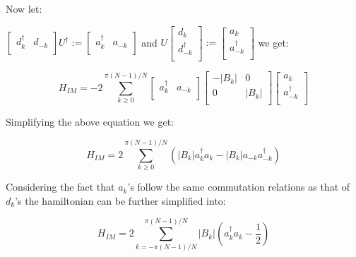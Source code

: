 \documentclass[11pt,a4paper]{article}
\begin{document}
	  Now let:
	    
	  
	    
	    	    
	     $ \begin{bmatrix}
	    d_{k}^{\dagger} & d_{-k}\\
	    \end{bmatrix} U^{\dagger} := \begin{bmatrix}
	    a_{k}^{\dagger} & a_{-k}\\
	    \end{bmatrix} $ and $ U\begin{bmatrix}
	    d_{k}\\d_{-k}^{\dagger}\\
	    \end{bmatrix}  := \begin{bmatrix}
	    a_{k}\\a_{-k}^{\dagger}\\
	    \end{bmatrix}$ we get:
	    
	    
		    \begin{equation}
		    H_{IM} = -2\sum_{k\geq 0}^{ \pi (N-1)/N}\begin{bmatrix}
		    a_{k}^{\dagger} & a_{-k}\\
		    \end{bmatrix}  \begin{bmatrix}
		   -|B_{k}| & 0\\
		    0 & |B_{k}| \\
		    \end{bmatrix}\begin{bmatrix}
		    a_{k}\\a_{-k}^{\dagger}\\
		    \end{bmatrix}
		    \end{equation}
		    
		    Simplifying the above equation we get:
		    
		    \begin{equation}
		     H_{IM} = 2\sum_{k\geq 0}^{ \pi (N-1)/N} (|B_{k}|a_{k}^{\dagger}a_{k}-|B_{k}|a_{-k}a_{-k}^{\dagger})
		    \end{equation}
		    
		    Considering the fact that $a_{k}$'s follow the same commutation relations as that of $d_{k}$'s the hamiltonian can be further simplified into:
		    
		    \begin{equation}
		    H_{IM} = 2\sum_{k=- \pi (N-1)/N}^{ \pi (N-1)/N} |B_{k}|(a_{k}^{\dagger}a_{k}-\dfrac{1}{2}) 
		    \end{equation}
		
\end{document}
